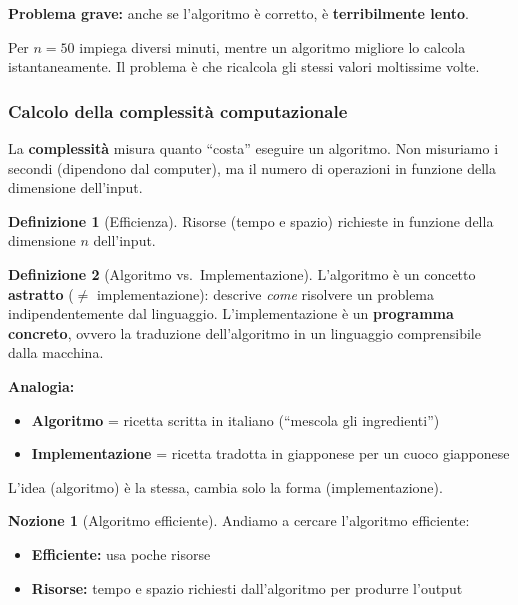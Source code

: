\documentclass[a4paper, 11pt]{article}
\theoremstyle{definition}
\newtheorem{definizione}{Definizione}[section]
\newtheorem{nozione}{Nozione}[section]
\theoremstyle{remark}
\theoremstyle{remark}
\newenvironment{nota}{%
	\begin{tcolorbox}[
		colback=codebg,
		colframe=primary,
		fonttitle=\bfseries,
		title=Nota,
		left=6pt, right=6pt, top=4pt, bottom=4pt
		]
	}{%
	\end{tcolorbox}
}
\begin{document}
	
	\begin{hardnote}
		\textbf{Problema grave:} anche se l'algoritmo è corretto, è \textbf{terribilmente lento}.
		
		Per $n=50$ impiega diversi minuti, mentre un algoritmo migliore lo calcola istantaneamente. Il problema è che ricalcola gli stessi valori moltissime volte.
	\end{hardnote}
	
	\newpage
	\subsubsection*{Calcolo della complessità computazionale}
	
	\begin{softnote}
		La \textbf{complessità} misura quanto ``costa'' eseguire un algoritmo. Non misuriamo i secondi (dipendono dal computer), ma il numero di operazioni in funzione della dimensione dell'input.
	\end{softnote}
	
	\begin{definizione}[Efficienza]
		Risorse (tempo e spazio) richieste in funzione della dimensione $n$ dell'input.
	\end{definizione}
	
	\begin{definizione}[Algoritmo vs.\ Implementazione]
		L'algoritmo è un concetto \textbf{astratto} ($\neq$ implementazione):
		descrive \textit{come} risolvere un problema indipendentemente dal linguaggio.
		L'implementazione è un \textbf{programma concreto}, ovvero la traduzione
		dell'algoritmo in un linguaggio comprensibile dalla macchina.
	\end{definizione}
	
	\begin{nota}
		\textbf{Analogia:}
		\begin{itemize}
			\item \textbf{Algoritmo} = ricetta scritta in italiano (``mescola gli ingredienti'')
			\item \textbf{Implementazione} = ricetta tradotta in giapponese per un cuoco giapponese
		\end{itemize}
		L'idea (algoritmo) è la stessa, cambia solo la forma (implementazione).
	\end{nota}
	
	\begin{nozione}[Algoritmo efficiente]
		Andiamo a cercare l'algoritmo efficiente:
		\begin{itemize}
			\item \textbf{Efficiente:} usa poche risorse
			\item \textbf{Risorse:} tempo e spazio richiesti dall'algoritmo
			per produrre l'output
		\end{itemize}
	\end{nozione}
	
\end{document}
